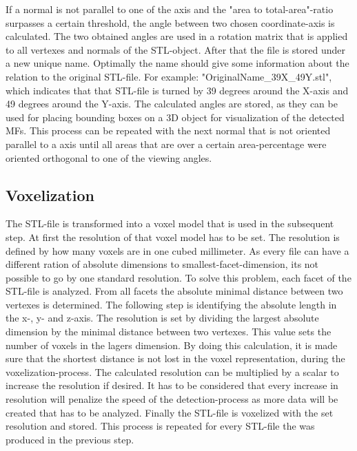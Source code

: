 \documentclass[conference]{IEEEtran}
\begin{document}
If a normal is not parallel to one of the axis and the "area to total-area"-ratio surpasses a certain threshold, the angle between two chosen coordinate-axis is calculated. The two obtained angles are used in a rotation matrix that is applied to all vertexes and normals of the STL-object. After that the file is stored under a new unique name. Optimally the name should give some information about the relation to the original STL-file. For example: "OriginalName\_39X\_49Y.stl", which indicates that that STL-file is turned by 39 degrees around the X-axis and 49 degrees around the Y-axis. The calculated angles are stored, as they can be used for placing bounding boxes on a 3D object for visualization of the detected MFs. This process can be repeated with the next normal that is not oriented parallel to a axis until all areas that are over a certain area-percentage were oriented orthogonal to one of the viewing angles.
\subsection{Voxelization}
The STL-file is transformed into a voxel model that is used in the subsequent step. At first the resolution of that voxel model has to be set. The resolution is defined by how many voxels are in one cubed millimeter. As every file can have a different ration of absolute dimensions to smallest-facet-dimension, its not possible to go by one standard resolution. To solve this problem, each facet of the STL-file is analyzed. From all facets the absolute minimal distance between two vertexes is determined. The following step is identifying the absolute length in the x-, y- and z-axis. The resolution is set by dividing the largest absolute dimension by the minimal distance between two vertexes. This value sets the number of voxels in the lagers dimension. 
By doing this calculation, it is made sure that the shortest distance is not lost in the voxel representation, during the voxelization-process. The calculated resolution can be multiplied by a scalar to increase the resolution if desired. It has to be considered that every increase in resolution will penalize the speed of the detection-process as more data will be created that has to be analyzed.    
Finally the STL-file is voxelized with the set resolution and stored. This process is repeated for every STL-file the was produced in the previous step.   
\end{document}
